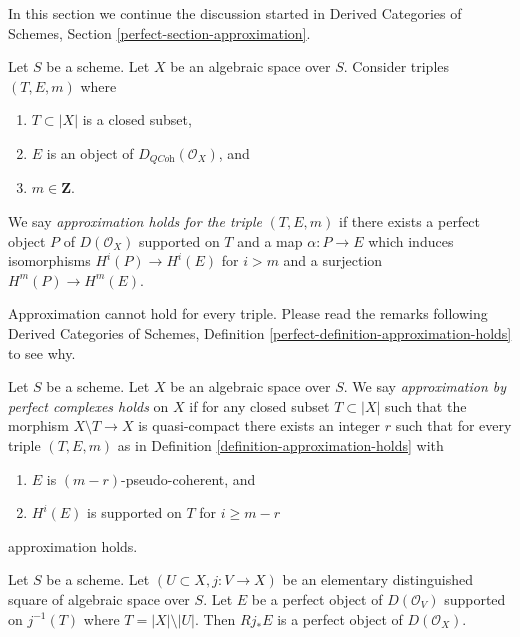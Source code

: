 \noindent
In this section we continue the discussion started in
Derived Categories of Schemes, Section \ref{perfect-section-approximation}.

\begin{definition}
\label{definition-approximation-holds}
Let $S$ be a scheme. Let $X$ be an algebraic space over $S$.
Consider triples $(T, E, m)$ where
\begin{enumerate}
\item $T \subset |X|$ is a closed subset,
\item $E$ is an object of $D_{\textit{QCoh}}(\mathcal{O}_X)$, and
\item $m \in \mathbf{Z}$.
\end{enumerate}
We say {\it approximation holds for the triple} $(T, E, m)$ if
there exists a perfect object $P$ of $D(\mathcal{O}_X)$ supported on $T$
and a map $\alpha : P \to E$ which induces isomorphisms $H^i(P) \to H^i(E)$
for $i > m$ and a surjection $H^m(P) \to H^m(E)$.
\end{definition}

\noindent
Approximation cannot hold for every triple. Please read the remarks following
Derived Categories of Schemes, Definition
\ref{perfect-definition-approximation-holds} to see why.

\begin{definition}
\label{definition-approximation}
Let $S$ be a scheme. Let $X$ be an algebraic space over $S$.
We say {\it approximation by perfect complexes holds}
on $X$ if for any closed subset $T \subset |X|$ such that
the morphism $X \setminus T \to X$ is quasi-compact
there exists an integer $r$ such that for every triple $(T, E, m)$ as in
Definition \ref{definition-approximation-holds} with
\begin{enumerate}
\item $E$ is $(m - r)$-pseudo-coherent, and
\item $H^i(E)$ is supported on $T$ for $i \geq m - r$
\end{enumerate}
approximation holds.
\end{definition}

\begin{lemma}
\label{lemma-pushforward-perfect}
Let $S$ be a scheme. Let $(U \subset X, j : V \to X)$ be an
elementary distinguished square of algebraic space over $S$.
Let $E$ be a perfect object of $D(\mathcal{O}_V)$ supported on
$j^{-1}(T)$ where $T = |X| \setminus |U|$. Then $Rj_*E$ is a
perfect object of $D(\mathcal{O}_X)$.
\end{lemma}

